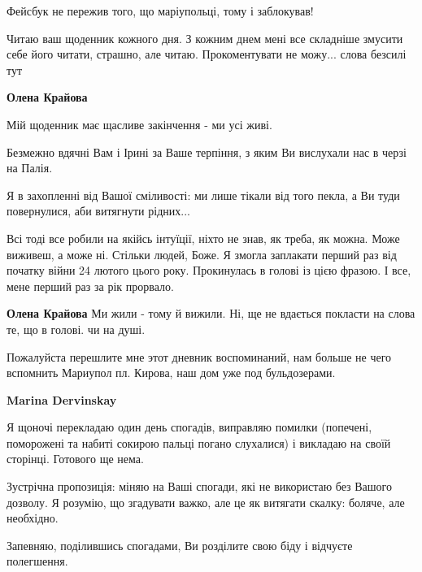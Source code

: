  
 
 
 
 

\qqSecCmt


Фейсбук не пережив того, що маріупольці, тому і заблокував!


Читаю ваш щоденник кожного дня. З кожним днем мені все складніше змусити себе
його читати, страшно, але читаю. Прокоментувати не можу... слова безсилі тут

\begin{itemize} %
\textbf{Олена Крайова} 

Мій щоденник має щасливе закінчення - ми усі живі.

Безмежно вдячні Вам і Ірині за Ваше терпіння, з яким Ви вислухали нас в черзі
на Палія.

Я в захопленні від Вашої сміливості: ми лише тікали від того пекла, а Ви туди
повернулися, аби витягнути рідних...


Всі тоді все робили на якійсь інтуїції, ніхто не знав, як треба, як можна. Може
виживеш, а може ні. Стільки людей, Боже. Я змогла заплакати перший раз від
початку війни 24 лютого цього року. Прокинулась в голові із цією фразою. І все,
мене перший раз за рік прорвало.

\textbf{Олена Крайова} Ми жили - тому й вижили.
Ні, ще не вдається покласти на слова те, що в голові. чи на душі.
\end{itemize} %


Пожалуйста перешлите мне этот дневник воспоминаний, нам больше не чего
вспомнить Мариупол пл. Кирова, наш дом уже под бульдозерами.

\begin{itemize} %
\textbf{Marina Dervinskay} 

Я щоночі перекладаю один день спогадів, виправляю помилки (попечені, поморожені
та набиті сокирою пальці погано слухалися) і викладаю на своїй сторінці.
Готового ще нема.

Зустрічна пропозиція: міняю на Ваші спогади, які не використаю без Вашого
дозволу. Я розумію, що згадувати важко, але це як витягати скалку: боляче, але
необхідно.

Запевняю, поділившись спогадами, Ви розділите свою біду і відчуєте полегшення.

\end{itemize} %
